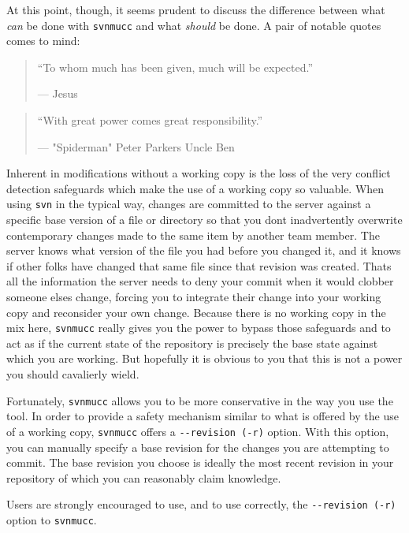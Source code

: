At this point, though, it seems prudent to discuss the difference
between what \emph{can} be done with \texttt{svnmucc} and what
\emph{should} be done. A pair of notable quotes comes to mind:

\begin{quote}
``To whom much has been given, much will be expected.''

--- Jesus
\end{quote}

\begin{quote}
``With great power comes great responsibility.''

--- "Spiderman" Peter Parker\textquotesingle s Uncle Ben
\end{quote}

Inherent in modifications without a working copy is the loss of the very
conflict detection safeguards which make the use of a working copy so
valuable. When using \texttt{svn} in the typical way, changes are
committed to the server against a specific base version of a file or
directory so that you don\textquotesingle t inadvertently overwrite
contemporary changes made to the same item by another team member. The
server knows what version of the file you had before you changed it, and
it knows if other folks have changed that same file since that revision
was created. That\textquotesingle s all the information the server needs
to deny your commit when it would clobber someone else\textquotesingle s
change, forcing you to integrate their change into your working copy and
reconsider your own change. Because there is no working copy in the mix
here, \texttt{svnmucc} really gives you the power to bypass those
safeguards and to act as if the current state of the repository is
precisely the base state against which you are working. But hopefully it
is obvious to you that this is not a power you should cavalierly wield.

Fortunately, \texttt{svnmucc} allows you to be more conservative in the
way you use the tool. In order to provide a safety mechanism similar to
what is offered by the use of a working copy, \texttt{svnmucc} offers a
\texttt{-\/-revision\ (-r)} option. With this option, you can manually
specify a base revision for the changes you are attempting to commit.
The base revision you choose is ideally the most recent revision in your
repository of which you can reasonably claim knowledge.

Users are strongly encouraged to use, and to use correctly, the
\texttt{-\/-revision\ (-r)} option to \texttt{svnmucc}.

